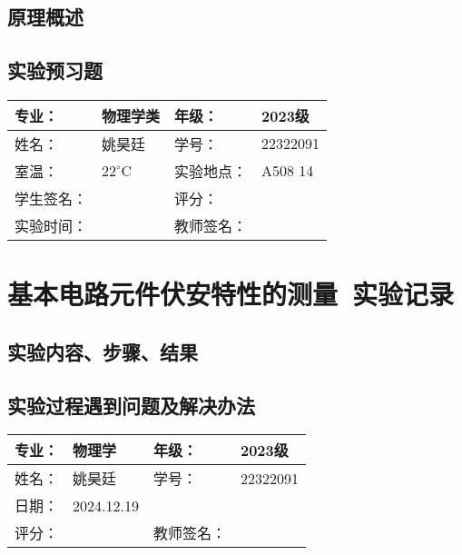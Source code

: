 \documentclass[dvipsnames, svgnames,a4paper,11pt]{article}
\newcommand{\exname}{基本电路元件伏安特性的测量}%
\begin{document}
\subsection{原理概述}
\subsection{实验预习题}
\begin{question}
    
\end{question}

\clearpage
{}
\begin{table}
	\renewcommand\arraystretch{1.7}
	\centering
	\begin{tabularx}{\textwidth}{|X|X|X|X|}
	\hline
	专业：& 物理学类 &年级：& 2023级 \\
	\hline
	姓名： &姚昊廷& 学号：&22322091  \\
	\hline
	室温：&$22^\circ$C&实验地点：&A508  14\\
	\hline
	学生签名：& & 评分： &\\
	\hline
	实验时间：& & 教师签名：&\\
	\hline
	\end{tabularx}
\end{table}
\section{\exname\ \textbf{实验记录}}
\subsection{实验内容、步骤、结果}

\subsection{实验过程遇到问题及解决办法}

\clearpage
{}
\begin{table}
	\renewcommand\arraystretch{1.7}
	\begin{tabularx}{\textwidth}{|X|X|X|X|}
	\hline
	专业：& 物理学 &年级：& 2023级\\
	\hline
	姓名： &姚昊廷& 学号：&22322091 \\
	\hline
    日期：&2024.12.19 &  &\\
	\hline
	评分：&&教师签名：&\\
	\hline
	\end{tabularx}
\end{table}
\end{document}
